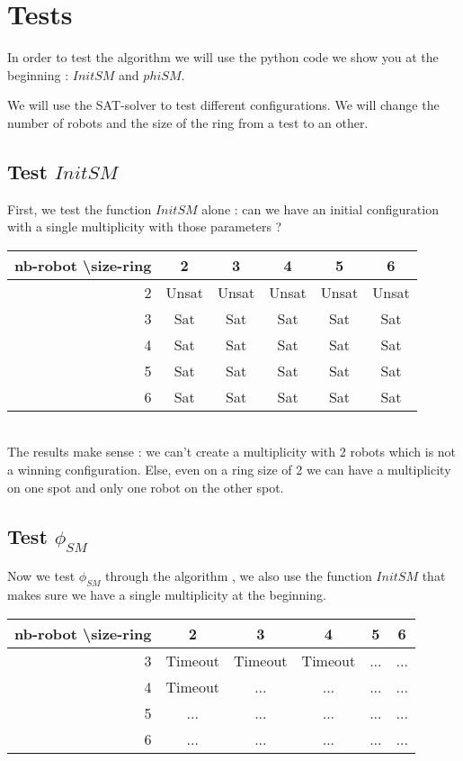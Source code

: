 \documentclass{article}
\begin{document}
\section{Tests}

In order to test the algorithm \cite{algo} we will use the python code we show you at the beginning : $InitSM$ and $phiSM$.

We will use the SAT-solver to test different configurations. We will change the number of robots and the size of the ring from a test to an other.

\subsection{Test $InitSM$}

First, we test the function $InitSM$ alone : can we have an initial configuration with a single multiplicity with those parameters ?\\

\begin{tabular}{|r|c|c|c|c|c|}
  \hline
  nb-robot \textbackslash size-ring & 2 & 3 & 4 & 5 & 6\\
  \hline
  2 & Unsat & Unsat & Unsat & Unsat & Unsat \\
  \hline
  3 & Sat & Sat & Sat & Sat & Sat \\
  \hline
  4 & Sat & Sat & Sat & Sat & Sat \\
  \hline
  5 & Sat & Sat & Sat & Sat & Sat \\
  \hline
  6 & Sat & Sat & Sat & Sat & Sat \\
  \hline
\end{tabular}
\\

The results make sense : we can't create a multiplicity with 2 robots which is not a winning configuration. Else, even on a ring size of 2 we can have a multiplicity on one spot and only one robot on the other spot.

\subsection{Test $\phi_{SM}$}

Now we test $\phi_{SM}$ through the algorithm \cite{algo}, we also use the function $InitSM$ that makes sure we have a single multiplicity at the beginning.\\

\begin{tabular}{|r|c|c|c|c|c|}
  \hline
  nb-robot \textbackslash size-ring & 2 & 3 & 4 & 5 & 6\\
  \hline
  3 & Timeout & Timeout & Timeout & ... & ... \\
  \hline
  4 & Timeout & ... & ... & ... & ... \\
  \hline
  5 & ... & ... & ... & ... & ... \\
  \hline
  6 & ... & ... & ... & ... & ... \\
  \hline
\end{tabular}
\\
\end{document}
